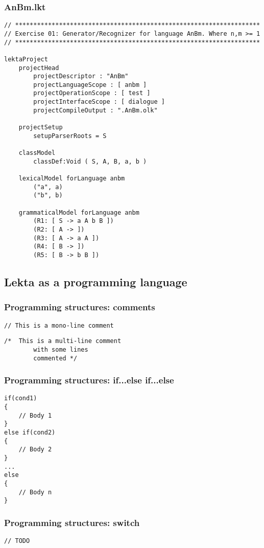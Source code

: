 \documentclass[11pt]{beamer}
\begin{document}
\begin{frame}[fragile]
\frametitle{AnBm.lkt}
\tiny
\begin{lstlisting}[language=lekta]
// *******************************************************************
// Exercise 01: Generator/Recognizer for language AnBm. Where n,m >= 1
// *******************************************************************

lektaProject
	projectHead
		projectDescriptor : "AnBm"
		projectLanguageScope : [ anbm ]
		projectOperationScope : [ test ]
		projectInterfaceScope : [ dialogue ]
		projectCompileOutput : ".AnBm.olk"

	projectSetup
		setupParserRoots = S

	classModel
		classDef:Void ( S, A, B, a, b )

	lexicalModel forLanguage anbm
		("a", a)
		("b", b)

	grammaticalModel forLanguage anbm
		(R1: [ S -> a A b B ])
		(R2: [ A -> ])
		(R3: [ A -> a A ])
		(R4: [ B -> ])
		(R5: [ B -> b B ])
\end{lstlisting}
\end{frame}

\subsection{Lekta as a programming language}

\begin{frame}[fragile]
\frametitle{Programming structures: comments}
\begin{lstlisting}[language=lekta]
// This is a mono-line comment
\end{lstlisting}

\begin{lstlisting}[language=lekta]
/*	This is a multi-line comment
		with some lines	
		commented */
\end{lstlisting}
\end{frame}

\begin{frame}[fragile]
\frametitle{Programming structures: if...else if...else}
\begin{lstlisting}[language=lekta]
if(cond1)
{
	// Body 1
}
else if(cond2)
{
	// Body 2
}
...
else
{
	// Body n
}
\end{lstlisting}
\end{frame}

\begin{frame}[fragile]
\frametitle{Programming structures: switch}
\begin{lstlisting}[language=lekta]
// TODO
\end{lstlisting}
\end{frame}
\end{document}
